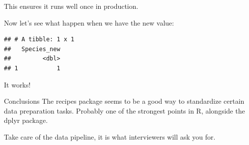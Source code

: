 \documentclass[]{article}
\newenvironment{Shaded}{\begin{snugshade}}{\end{snugshade}}
\newcommand{\KeywordTok}[1]{\textcolor[rgb]{0.13,0.29,0.53}{\textbf{#1}}}
\newcommand{\DataTypeTok}[1]{\textcolor[rgb]{0.13,0.29,0.53}{#1}}
\newcommand{\DecValTok}[1]{\textcolor[rgb]{0.00,0.00,0.81}{#1}}
\newcommand{\StringTok}[1]{\textcolor[rgb]{0.31,0.60,0.02}{#1}}
\newcommand{\OperatorTok}[1]{\textcolor[rgb]{0.81,0.36,0.00}{\textbf{#1}}}
\newcommand{\NormalTok}[1]{#1}
\begin{document}
This ensures it runs well once in production.

Now let's see what happen when we have the new value:

\begin{Shaded}
\end{Shaded}

\begin{verbatim}
## # A tibble: 1 x 1
##   Species_new
##         <dbl>
## 1           1
\end{verbatim}

It works!

Conclusions The recipes package seems to be a good way to standardize
certain data preparation tasks. Probably one of the strongest points in
R, alongside the dplyr package.

Take care of the data pipeline, it is what interviewers will ask you
for.
\end{document}
